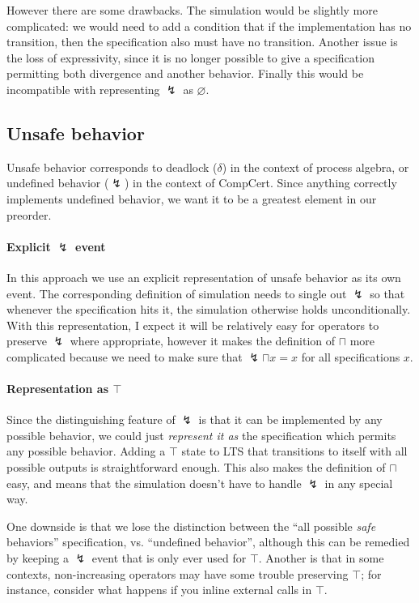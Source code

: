 \documentclass[11pt]{article}
\begin{document}
However there are some drawbacks.
The simulation would be slightly more complicated:
we would need to add a condition that
if the implementation has no transition,
then the specification also must have no transition.
Another issue is the loss of expressivity,
since it is no longer possible to give a specification
permitting both divergence and another behavior.
Finally this would be incompatible with
representing $\lightning$ as $\varnothing$.


\subsection{Unsafe behavior} %

Unsafe behavior
corresponds to deadlock ($\delta$) in the context of process algebra,
or undefined behavior ($\lightning$) in the context of CompCert.
Since anything correctly implements undefined behavior,
we want it to be a greatest element in our preorder.

\paragraph{Explicit $\lightning$ event}

In this approach we use an explicit representation of
unsafe behavior as its own event.
The corresponding definition of simulation needs to single out $\lightning$
so that whenever the specification hits it,
the simulation otherwise holds unconditionally.
With this representation,
I expect it will be relatively easy
for operators to preserve $\lightning$ where appropriate,
however it makes the definition of $\sqcap$
more complicated because we need to make sure that
$\lightning \sqcap x = x$ for all specifications $x$.

\paragraph{Representation as $\top$}

Since the distinguishing feature of $\lightning$ is that
it can be implemented by any possible behavior,
we could just \emph{represent it as}
the specification which permits any possible behavior.
Adding a $\top$ state to LTS that transitions to itself
with all possible outputs is straightforward enough.
This also makes the definition of $\sqcap$ easy,
and means that the simulation doesn't have to handle $\lightning$
in any special way.

One downside is that we lose the distinction between
the ``all possible \emph{safe} behaviors'' specification,
vs. ``undefined behavior'',
although this can be remedied by keeping a $\lightning$ event
that is only ever used for $\top$.
Another is that in some contexts,
non-increasing operators 
may have some trouble preserving $\top$;
for instance, consider what happens if you
inline external calls in $\top$.
\end{document}
